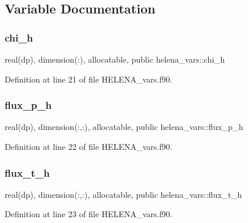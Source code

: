 \subsection{Variable Documentation}
\mbox{\label{namespacehelena__vars_aaaa83af362a93836b4dc74bdfa715d1a}} 
\subsubsection{\texorpdfstring{chi\+\_\+h}{chi\_h}}
{\footnotesize\ttfamily real(dp), dimension(\+:), allocatable, public helena\+\_\+vars\+::chi\+\_\+h}



Definition at line 21 of file H\+E\+L\+E\+N\+A\+\_\+vars.\+f90.

\mbox{\label{namespacehelena__vars_ab84791cf288fa3209eafb797479d1e47}} 
\subsubsection{\texorpdfstring{flux\+\_\+p\+\_\+h}{flux\_p\_h}}
{\footnotesize\ttfamily real(dp), dimension(\+:,\+:), allocatable, public helena\+\_\+vars\+::flux\+\_\+p\+\_\+h}



Definition at line 22 of file H\+E\+L\+E\+N\+A\+\_\+vars.\+f90.

\mbox{\label{namespacehelena__vars_af28db18d415da215cae4d9ec9f60e18b}} 
\subsubsection{\texorpdfstring{flux\+\_\+t\+\_\+h}{flux\_t\_h}}
{\footnotesize\ttfamily real(dp), dimension(\+:,\+:), allocatable, public helena\+\_\+vars\+::flux\+\_\+t\+\_\+h}



Definition at line 23 of file H\+E\+L\+E\+N\+A\+\_\+vars.\+f90.

